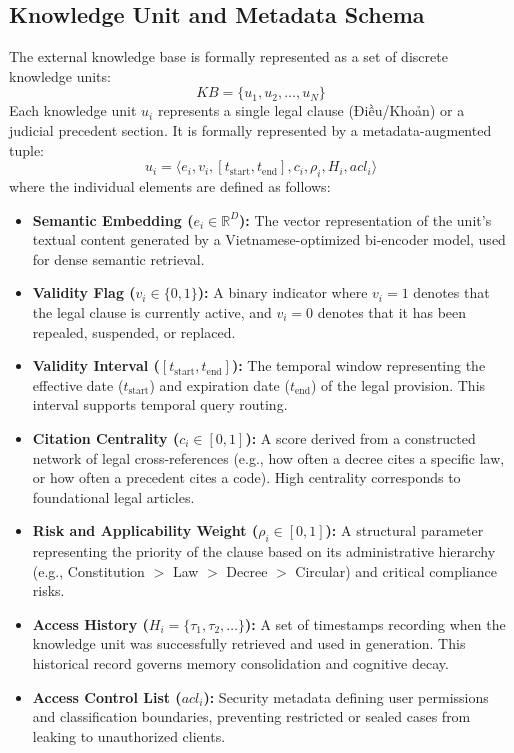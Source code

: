 \subsection{Knowledge Unit and Metadata Schema}
The external knowledge base is formally represented as a set of discrete knowledge units:
\begin{equation}
    KB = \{u_1, u_2, \dots, u_N\}
\end{equation}
Each knowledge unit $u_i$ represents a single legal clause (Điều/Khoản) or a judicial precedent section. It is formally represented by a metadata-augmented tuple:
\begin{equation}
    u_i = \langle e_i, v_i, [t_{\text{start}}, t_{\text{end}}], c_i, \rho_i, H_i, acl_i \rangle
\end{equation}
where the individual elements are defined as follows:
\begin{itemize}
    \item \textbf{Semantic Embedding ($e_i \in \mathbb{R}^D$):} The vector representation of the unit's textual content generated by a Vietnamese-optimized bi-encoder model, used for dense semantic retrieval.
    \item \textbf{Validity Flag ($v_i \in \{0, 1\}$):} A binary indicator where $v_i = 1$ denotes that the legal clause is currently active, and $v_i = 0$ denotes that it has been repealed, suspended, or replaced.
    \item \textbf{Validity Interval ($[t_{\text{start}}, t_{\text{end}}]$):} The temporal window representing the effective date ($t_{\text{start}}$) and expiration date ($t_{\text{end}}$) of the legal provision. This interval supports temporal query routing.
    \item \textbf{Citation Centrality ($c_i \in [0, 1]$):} A score derived from a constructed network of legal cross-references (e.g., how often a decree cites a specific law, or how often a precedent cites a code). High centrality corresponds to foundational legal articles.
    \item \textbf{Risk and Applicability Weight ($\rho_i \in [0, 1]$):} A structural parameter representing the priority of the clause based on its administrative hierarchy (e.g., Constitution $>$ Law $>$ Decree $>$ Circular) and critical compliance risks.
    \item \textbf{Access History ($H_i = \{\tau_1, \tau_2, \dots\}$):} A set of timestamps recording when the knowledge unit was successfully retrieved and used in generation. This historical record governs memory consolidation and cognitive decay.
    \item \textbf{Access Control List ($acl_i$):} Security metadata defining user permissions and classification boundaries, preventing restricted or sealed cases from leaking to unauthorized clients.
\end{itemize}

